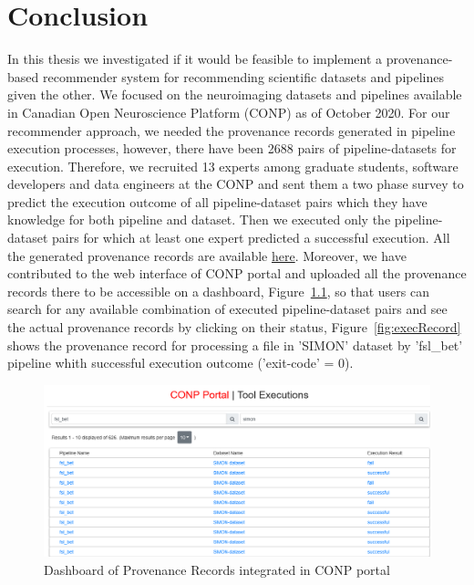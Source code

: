 \chapter{Conclusion}
\label{conclusion}

In this thesis we investigated if it would be feasible to implement a provenance-based recommender system for recommending scientific datasets and pipelines given the other. We focused on the neuroimaging datasets and pipelines available in Canadian Open Neuroscience Platform (CONP) as of October 2020. For our recommender approach, we needed the provenance records generated in pipeline execution processes, however, there have been 2688 pairs of pipeline-datasets for execution. Therefore, we recruited 13 experts among graduate students, software developers and data engineers at the CONP and sent them a two phase survey to predict the execution outcome of all pipeline-dataset pairs which they have knowledge for both pipeline and dataset. Then we executed only the pipeline-dataset pairs for which at least one expert predicted a successful execution. All the generated provenance records are available \href{https://github.com/big-data-lab-team/paper-pipelines-datasets-recommender/tree/main/data/}{here}. Moreover, we have contributed to the web interface of CONP portal and uploaded all the provenance records there to be accessible on a dashboard, Figure~\ref{fig:dashProvenance}, so that users can search for any available combination of executed pipeline-dataset pairs and see the actual provenance records by clicking on their status, Figure~\ref{fig:execRecord} shows the provenance record for processing a file in 'SIMON' dataset by 'fsl\_bet' pipeline whith successful execution outcome ('exit-code' = 0).

\begin{figure}
    \centering
    \includegraphics[width=\textwidth,height=\textheight,keepaspectratio]{figures/executiondashboard.png}
    \caption{Dashboard of Provenance Records integrated in CONP portal}
    \label{fig:dashProvenance}
\end{figure}

